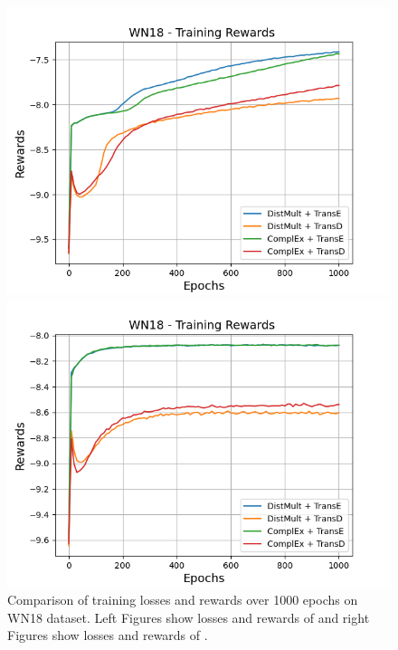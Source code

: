 \begin{figure}[H]
\begin{minipage}{.45\textwidth}
      \includegraphics[width=0.9\linewidth]{figures/results/gan_train/not_pretrained/random/wn18/epochs1000/random_wn18_rew.png}
    \end{minipage}%
    \begin{minipage}{.45\textwidth}
      \centering
      \includegraphics[width=0.9\linewidth]{figures/results/gan_train/not_pretrained/uncertainty/max_distribution/entropy/wn18/1k_epochs/uncertainty_wn18_rew.png}
    \end{minipage}%
    \caption{Comparison of training losses and rewards over 1000 epochs on \textsc{WN18} dataset.
    Left Figures show losses and rewards of \origsampling and right Figures show losses and rewards of \ussoftmax.}
    \label{fig:advtrain_wn18_losses_rewards}
\end{figure}
